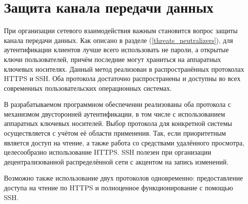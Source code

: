 \section{Защита канала передачи данных} \label{technologic_network_security}

При организации сетевого взаимодействия важным становится вопрос защиты канала передачи данных.
Как описано в разделе (\ref{threats_neutralizers}), для аутентификации клиентов лучше всего использовать не пароли, а открытые ключи пользователей, причём последние могут храниться на аппаратных ключевых носителях.
Данный метод реализован в распространённых протоколах HTTPS и SSH.
Оба протокола достаточно распространены и доступны во всех современных пользовательских операционных системах.

\vspace{\baselineskip}
В разрабатываемом программном обеспечении реализованы оба протокола с механизмом двусторонней аутентификации, в том числе с использованием аппаратных ключевых носителей.
Выбор протокола для конкретной системы осуществляется с учётом её области применения.
Так, если приоритетным является доступ на чтение, а также работа со средствами удалённого просмотра, целесообразно использование HTTPS.
SSH полезен при организации децентрализованной распределённой сети с акцентом на запись изменений.

\vspace{\baselineskip}
Возможно также использование двух протоколов одновременно: предоставление доступа на чтение по HTTPS и полноценное функционирование с помощью SSH.